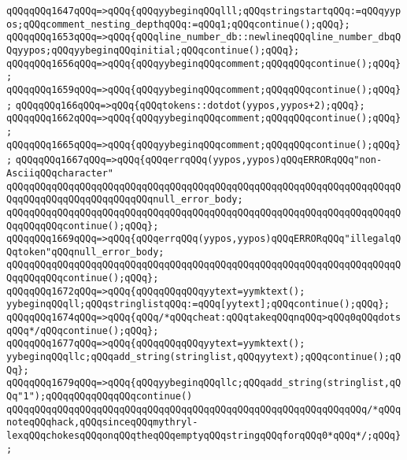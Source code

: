 \verb|qQQqqQQq1647qQQq=>qQQq{qQQqyybeginqQQqlll;qQQqstringstartqQQq:=qQQqyypos;qQQqcomment_nesting_depthqQQq:=qQQq1;qQQqcontinue();qQQq};|\newline
\verb|qQQqqQQq1653qQQq=>qQQq{qQQqline_number_db::newlineqQQqline_number_dbqQQqyypos;qQQqyybeginqQQqinitial;qQQqcontinue();qQQq};|\newline
\verb|qQQqqQQq1656qQQq=>qQQq{qQQqyybeginqQQqcomment;qQQqqQQqcontinue();qQQq};|\newline
\verb|qQQqqQQq1659qQQq=>qQQq{qQQqyybeginqQQqcomment;qQQqqQQqcontinue();qQQq};|\newline
\verb|qQQqqQQq166qQQq=>qQQq{qQQqtokens::dotdot(yypos,yypos+2);qQQq};|\newline
\verb|qQQqqQQq1662qQQq=>qQQq{qQQqyybeginqQQqcomment;qQQqqQQqcontinue();qQQq};|\newline
\verb|qQQqqQQq1665qQQq=>qQQq{qQQqyybeginqQQqcomment;qQQqqQQqcontinue();qQQq};|\newline
\verb|qQQqqQQq1667qQQq=>qQQq{qQQqerrqQQq(yypos,yypos)qQQqERRORqQQq"non-AsciiqQQqcharacter"|\newline
\verb|qQQqqQQqqQQqqQQqqQQqqQQqqQQqqQQqqQQqqQQqqQQqqQQqqQQqqQQqqQQqqQQqqQQqqQQqqQQqqQQqqQQqqQQqqQQqqQQqnull_error_body;|\newline
\verb|qQQqqQQqqQQqqQQqqQQqqQQqqQQqqQQqqQQqqQQqqQQqqQQqqQQqqQQqqQQqqQQqqQQqqQQqqQQqqQQqcontinue();qQQq};|\newline
\verb|qQQqqQQq1669qQQq=>qQQq{qQQqerrqQQq(yypos,yypos)qQQqERRORqQQq"illegalqQQqtoken"qQQqnull_error_body;|\newline
\verb|qQQqqQQqqQQqqQQqqQQqqQQqqQQqqQQqqQQqqQQqqQQqqQQqqQQqqQQqqQQqqQQqqQQqqQQqqQQqqQQqcontinue();qQQq};|\newline
\verb|qQQqqQQq1672qQQq=>qQQq{qQQqqQQqqQQqyytext=yymktext();|\newline
\verb|yybeginqQQqll;qQQqstringlistqQQq:=qQQq[yytext];qQQqcontinue();qQQq};|\newline
\verb|qQQqqQQq1674qQQq=>qQQq{qQQq/*qQQqcheat:qQQqtakeqQQqnqQQq>qQQq0qQQqdotsqQQq*/qQQqcontinue();qQQq};|\newline
\verb|qQQqqQQq1677qQQq=>qQQq{qQQqqQQqqQQqyytext=yymktext();|\newline
\verb|yybeginqQQqllc;qQQqadd_string(stringlist,qQQqyytext);qQQqcontinue();qQQq};|\newline
\verb|qQQqqQQq1679qQQq=>qQQq{qQQqyybeginqQQqllc;qQQqadd_string(stringlist,qQQq"1");qQQqqQQqqQQqqQQqcontinue()|\newline
\verb|qQQqqQQqqQQqqQQqqQQqqQQqqQQqqQQqqQQqqQQqqQQqqQQqqQQqqQQqqQQqqQQq/*qQQqnoteqQQqhack,qQQqsinceqQQqmythryl-lexqQQqchokesqQQqonqQQqtheqQQqemptyqQQqstringqQQqforqQQq0*qQQq*/;qQQq};|\newline
